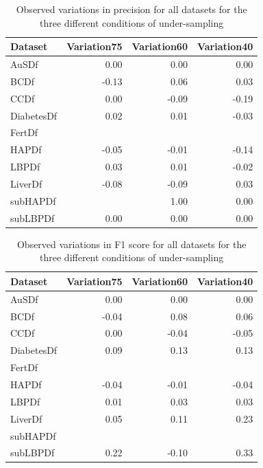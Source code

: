 \begin{table}[ht]
\centering
\begin{tabular}{lrrr}
  \hline
  \rowcolor{LightCyan}
Dataset & Variation75 & Variation60 & Variation40 \\ 
  \hline
AuSDf & 0.00 & 0.00 & 0.00 \\ 
  BCDf & -0.13 & 0.06 & 0.03 \\ 
  CCDf & 0.00 & -0.09 & -0.19 \\ 
  DiabetesDf & 0.02 & 0.01 & -0.03 \\ 
  FertDf &  &  &  \\ 
  HAPDf & -0.05 & -0.01 & -0.14 \\ 
  LBPDf & 0.03 & 0.01 & -0.02 \\ 
  LiverDf & -0.08 & -0.09 & 0.03 \\ 
  subHAPDf &  & 1.00 & 0.00 \\ 
  subLBPDf & 0.00 & 0.00 & 0.00 \\ 
   \hline
\end{tabular}
\caption{Observed variations in precision for all datasets for the three different conditions of under-sampling}
\end{table}

\begin{table}[ht]
\centering
\begin{tabular}{lrrr}
  \hline
  \rowcolor{LightCyan}
Dataset & Variation75 & Variation60 & Variation40 \\ 
  \hline
AuSDf & 0.00 & 0.00 & 0.00 \\ 
  BCDf & -0.04 & 0.08 & 0.06 \\ 
  CCDf & 0.00 & -0.04 & -0.05 \\ 
  DiabetesDf & 0.09 & 0.13 & 0.13 \\ 
  FertDf &  &  &  \\ 
  HAPDf & -0.04 & -0.01 & -0.04 \\ 
  LBPDf & 0.01 & 0.03 & 0.03 \\ 
  LiverDf & 0.05 & 0.11 & 0.23 \\ 
  subHAPDf &  &  &  \\ 
  subLBPDf & 0.22 & -0.10 & 0.33 \\ 
   \hline
\end{tabular}
\caption{Observed variations in F1 score for all datasets for the three different conditions of under-sampling}
\end{table}


